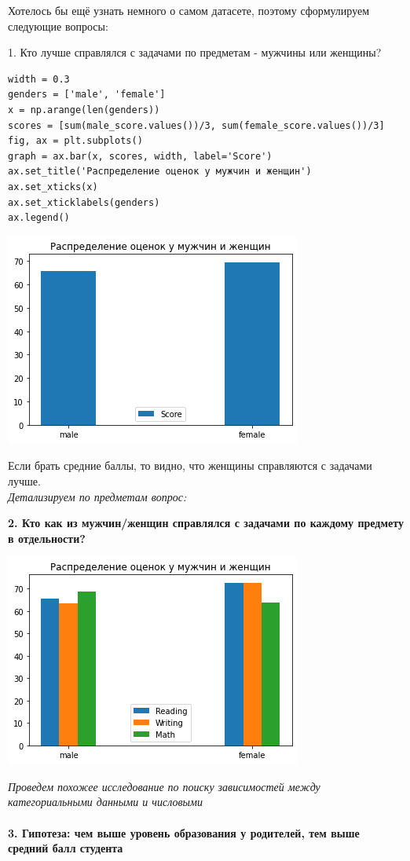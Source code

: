 \documentclass[12pt,a4paper]{article}
\begin{document}
Хотелось бы ещё узнать немного о самом датасете, поэтому сформулируем следующие вопросы:

1. Кто лучше справлялся с задачами по предметам - мужчины или женщины?

\begin{verbatim}
width = 0.3
genders = ['male', 'female']
x = np.arange(len(genders))
scores = [sum(male_score.values())/3, sum(female_score.values())/3]
fig, ax = plt.subplots()
graph = ax.bar(x, scores, width, label='Score')
ax.set_title('Распределение оценок у мужчин и женщин')
ax.set_xticks(x)
ax.set_xticklabels(genders)
ax.legend()
\end{verbatim}

\includegraphics{mf_score_avg}

Если брать средние баллы, то видно, что женщины справляются с задачами лучше.\\
\textit{Детализируем по предметам вопрос:}

\textbf{2. Кто как из мужчин/женщин справлялся с задачами по каждому предмету в отдельности?}

\includegraphics{mf_score}

\textit{Проведем похожее исследование по поиску зависимостей между категориальными данными и числовыми}
\\
\\
\textbf{3. Гипотеза: чем выше уровень образования у родителей, тем выше средний балл студента}
\end{document}

